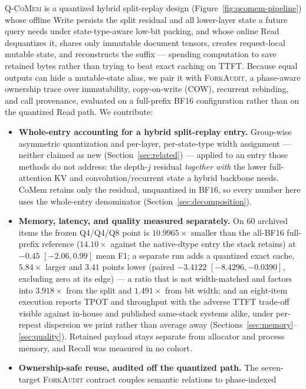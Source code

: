 \documentclass{article}
\newcommand{\qcomem}{\textsc{Q-CoMem}}
\newcommand{\method}{\textsc{ForkAudit}}
\begin{document}
\qcomem{} is a quantized hybrid split-replay design
(Figure~\ref{fig:qcomem-pipeline}) whose offline Write persists the split residual and all lower-layer state
a future query needs under state-type-aware low-bit packing, and whose online
Read dequantizes it, shares only immutable document tensors, creates
request-local mutable state, and reconstructs the suffix --- spending computation
to save retained bytes rather than trying to beat exact caching on TTFT.  Because
equal outputs can hide a mutable-state alias, we pair it with \method{}, a
phase-aware ownership trace over immutability, copy-on-write (COW), recurrent
rebinding, and call provenance, evaluated on a full-prefix BF16 configuration
rather than on the quantized Read path.  We contribute:
\begin{itemize}
  \setlength{\itemsep}{0pt}
  \setlength{\parskip}{0pt}
  \setlength{\topsep}{2pt}
  \setlength{\partopsep}{0pt}
  \item \textbf{Whole-entry accounting for a hybrid split-replay entry.}
Group-wise asymmetric quantization and per-layer, per-state-type width
assignment --- neither claimed as new (Section~\ref{sec:related}) --- applied to
an entry those methods do not address: the depth-$j$ residual \emph{together
with} the lower full-attention KV and convolution/recurrent state a hybrid
backbone needs.  CoMem retains only the residual, unquantized in BF16, so every
number here uses the whole-entry denominator
(Section~\ref{sec:decomposition}).
  \item \textbf{Memory, latency, and quality measured separately.} On 60
archived items the frozen Q4/Q4/Q8 point is $10.9965\times$ smaller than the
all-BF16 full-prefix reference ($14.10\times$ against the native-dtype entry the
stack retains) at $-0.45$ $[-2.06,0.99]$ mean F1; a separate run adds a
quantized exact cache, $5.84\times$ larger and $3.41$ points lower (paired
$-3.4122$ $[-8.4296,-0.0390]$, excluding zero at its edge) --- a ratio that is
not width-matched and factors into $3.918\times$ from the split and $1.491\times$
from bit width; and an eight-item execution reports TPOT and throughput with the
adverse TTFT trade-off visible against in-house and published same-stack systems
alike, under per-repeat dispersion we print rather than average away
(Sections~\ref{sec:memory}--\ref{sec:quality}).  Retained payload stays separate
from allocator and process memory, and Recall was measured in no cohort.
  \item \textbf{Ownership-safe reuse, audited off the quantized path.} The
seven-target \method{} contract couples semantic relations to phase-indexed

\end{itemize}
\end{document}
